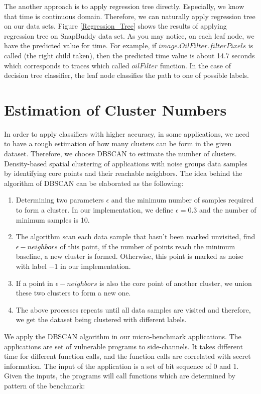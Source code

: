 \documentclass{article}
\begin{document}
The another approach is to apply regression tree directly. Especially,
we know that time is continuous domain. Therefore, we can naturally
apply regression tree on our data sets. Figure \ref{Regression_Tree}
shows the results of applying regression tree on SnapBuddy data set.
As you may notice, on each leaf node, we have the predicted value for
time. For example, if $image.OilFilter.filterPixels$ is called (the right child taken), 
then the predicted time value is about 14.7 seconds which corresponds to
traces which called $oilFilter$ function. In the case of decision tree classifier,
the leaf node classifies the path to one of possible labels. 



\section{Estimation of Cluster Numbers}
In order to apply classifiers with higher accuracy, in some applications, we need to have a rough estimation of how many clusters can be form in the given dataset. Therefore, we choose DBSCAN to estimate the number of clusters. Density-based spatial clustering of applications with noise groups data samples by identifying core points and their reachable neighbors.
The idea behind the algorithm of DBSCAN can be elaborated as the following:
\begin{enumerate}
    \item
    Determining two parameters $\epsilon$ and the minimum number of samples required to form a cluster. In our implementation, we define $\epsilon=0.3$ and the number of minimum samples is 10.
    \item
    The algorithm scan each data sample that hasn't been marked unvisited, find $\epsilon-neighbors$ of this point, if the number of points reach the minimum baseline, a new cluster is formed. Otherwise, this point is marked as noise with label $-1$ in our implementation.
    \item
    If a point in $\epsilon-neighbors$ is also the core point of another cluster, we union these two clusters to form a new one.
    \item
    The above processes repeats until all data samples are visited and therefore, we get the dataset being clustered with different labels.
\end{enumerate}
We apply the DBSCAN algorithm in our micro-benchmark applications. The applications are set of vulnerable programs to side-channels. It takes different time for different function calls, and the function calls are correlated with secret information. The input of the application is a set of bit sequence of 0 and 1. Given the inputs, the programs will call functions which are determined by pattern of the benchmark:
\end{document}
